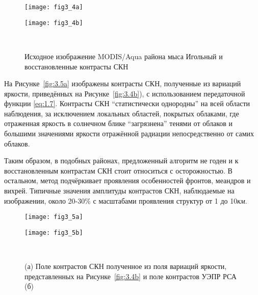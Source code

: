 \begin{figure}[H]
   	\centering
	\begin{minipage}{.47\textwidth}
	    \subcaptionbox{\label{fig:3.4a}}
		{\texttt{[image: fig3\_4a]}}
	\end{minipage}
	\hfill
	\begin{minipage}{.47\textwidth}
	    \subcaptionbox{\label{fig:3.4b}}
		{\texttt{[image: fig3\_4b]}}
	\end{minipage}
    \\
    \caption{Исходное изображение MODIS/Aqua района мыса Игольный и восстановленные контрасты СКН}
    \label{fig:3.4}
\end{figure}


На Рисунке~\ref{fig:3.5a} изображены контрасты СКН, полученные из вариаций яркости, приведённых на Рисунке~\ref{fig:3.4b}), с использованием передаточной функции \eqref{eq:1.7}. Контрасты СКН ``статистически однородны'' на всей области наблюдения, за исключением локальных областей, покрытых облаками, где отраженная яркость в солнечном блике ``загрязнена'' тенями от облаков и большими значениями яркости отражённой радиации непосредственно от самих облаков.

Таким образом, в подобных районах, предложенный алгоритм не годен и к восстановленным контрастам СКН стоит относиться с осторожностью. В остальном, метод подчёркивает проявления особенностей фронтов, меандров и вихрей. Типичные значения амплитуды контрастов СКН, наблюдаемые на изображении, около 20-30\% с масштабами проявления структур от 1 до 10\textit{км}.



\begin{figure}[H]
   	\centering
	\begin{minipage}{.47\textwidth}
	    \subcaptionbox{\label{fig:3.5a}}
		{\texttt{[image: fig3\_5a]}}
	\end{minipage}
	\hfill
	\begin{minipage}{.47\textwidth}
	    \subcaptionbox{\label{fig:3.5b}}
		{\texttt{[image: fig3\_5b]}}
	\end{minipage}
    \\
    \caption{(а) Поле контрастов СКН полученное из поля вариаций яркости, представленных на Рисунке~\ref{fig:3.4b} и поле контрастов УЭПР РСА (б)}
    \label{fig:3.5}
\end{figure}


